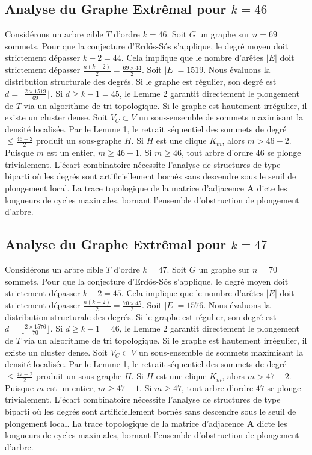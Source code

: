 \documentclass[11pt,a4paper]{article}
\begin{document}
\subsection{Analyse du Graphe Extr\^emal pour $k=46$}
Consid\'erons un arbre cible $T$ d'ordre $k=46$.
Soit $G$ un graphe sur $n=69$ sommets.
Pour que la conjecture d'Erd\H{o}s-S\'os s'applique, le degr\'e moyen doit strictement d\'epasser $k-2 = 44$.
Cela implique que le nombre d'ar\^etes $|E|$ doit strictement d\'epasser $\frac{n(k-2)}{2} = \frac{69 \times 44}{2}$.
Soit $|E| = 1519$.
Nous \'evaluons la distribution structurale des degr\'es. Si le graphe est r\'egulier, son degr\'e est $d = \lfloor \frac{2 \times 1519}{69} \rfloor$.
Si $d \geq k-1 = 45$, le Lemme 2 garantit directement le plongement de $T$ via un algorithme de tri topologique.
Si le graphe est hautement irr\'egulier, il existe un cluster dense. Soit $V_C \subset V$ un sous-ensemble de sommets maximisant la densit\'e localis\'ee.
Par le Lemme 1, le retrait s\'equentiel des sommets de degr\'e $\leq \frac{46-2}{2}$ produit un sous-graphe $H$.
Si $H$ est une clique $K_{m}$, alors $m > 46-2$. Puisque $m$ est un entier, $m \geq 46-1$. Si $m \geq 46$, tout arbre d'ordre $46$ se plonge trivialement.
L'\'ecart combinatoire n\'ecessite l'analyse de structures de type biparti o\`u les degr\'es sont artificiellement born\'es sans descendre sous le seuil de plongement local. La trace topologique de la matrice d'adjacence $\mathbf{A}$ dicte les longueurs de cycles maximales, bornant l'ensemble d'obstruction de plongement d'arbre.


\subsection{Analyse du Graphe Extr\^emal pour $k=47$}
Consid\'erons un arbre cible $T$ d'ordre $k=47$.
Soit $G$ un graphe sur $n=70$ sommets.
Pour que la conjecture d'Erd\H{o}s-S\'os s'applique, le degr\'e moyen doit strictement d\'epasser $k-2 = 45$.
Cela implique que le nombre d'ar\^etes $|E|$ doit strictement d\'epasser $\frac{n(k-2)}{2} = \frac{70 \times 45}{2}$.
Soit $|E| = 1576$.
Nous \'evaluons la distribution structurale des degr\'es. Si le graphe est r\'egulier, son degr\'e est $d = \lfloor \frac{2 \times 1576}{70} \rfloor$.
Si $d \geq k-1 = 46$, le Lemme 2 garantit directement le plongement de $T$ via un algorithme de tri topologique.
Si le graphe est hautement irr\'egulier, il existe un cluster dense. Soit $V_C \subset V$ un sous-ensemble de sommets maximisant la densit\'e localis\'ee.
Par le Lemme 1, le retrait s\'equentiel des sommets de degr\'e $\leq \frac{47-2}{2}$ produit un sous-graphe $H$.
Si $H$ est une clique $K_{m}$, alors $m > 47-2$. Puisque $m$ est un entier, $m \geq 47-1$. Si $m \geq 47$, tout arbre d'ordre $47$ se plonge trivialement.
L'\'ecart combinatoire n\'ecessite l'analyse de structures de type biparti o\`u les degr\'es sont artificiellement born\'es sans descendre sous le seuil de plongement local. La trace topologique de la matrice d'adjacence $\mathbf{A}$ dicte les longueurs de cycles maximales, bornant l'ensemble d'obstruction de plongement d'arbre.
\end{document}
